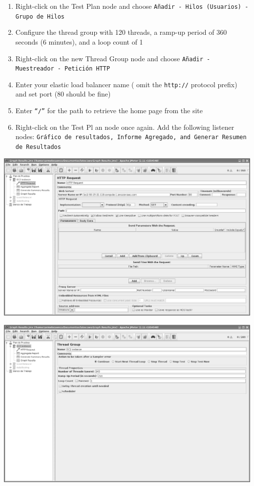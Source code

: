\documentclass{beamer}
\begin{document}
\begin{frame}
\begin{itemize}
\begin{enumerate}
\item Right-click on the Test Plan node and choose \texttt{Añadir - Hilos (Usuarios) - Grupo de Hilos}
\item Configure the thread group with 120 threads, a ramp-up period of 360 seconds (6 minutes), and a loop count of 1
\item Right-click on the new Thread Group node and choose \texttt{Añadir - Muestreador - Petición HTTP}
\item Enter your elastic load balancer  name  ( omit the \texttt{http://} protocol prefix) and set port (80  should be fine)
\item Enter \texttt{``/''} for the path to retrieve the home page from the site
\item Right-click on the Test Pl an node once again. Add the following listener nodes: \texttt{Gráfico de resultados, Informe Agregado, and Generar Resumen de Resultados}

\end{enumerate}

\begin{center}
\includegraphics[scale=0.15]{plandeprueba.eps}
\end{center}
\begin{center}
\includegraphics[scale=0.15]{plandeprueba1.eps}
\end{center}



\end{itemize}
\end{frame}
\end{document}
